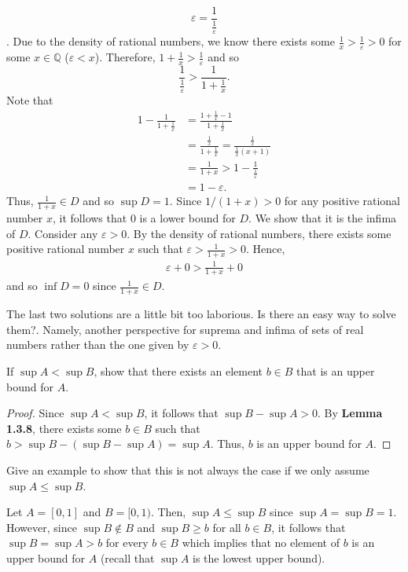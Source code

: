 \documentclass[12pt]{article}
\newcommand{\Q}{\mathbb{Q}}
\newenvironment{problem}[2][Problem]{\begin{trivlist}
		\item[\hskip \labelsep {\bfseries #1}\hskip \labelsep {\bfseries #2.}]}{\end{trivlist}}
\newenvironment{solution}[2][Solution]{\begin{trivlist}
		\item[\hskip \labelsep {\bfseries #1}\hskip \labelsep {\bfseries #2.}]}{\end{trivlist}}
\begin{document}
\begin{problem}{1.3.8}
\begin{enumerate}[label=(\alph*)]
\begin{solution}{d}
		 \[\varepsilon = \frac{1}{\frac{1}{\varepsilon}}\].
		 Due to the density of rational numbers, we know there exists some $\frac{1}{x} > \frac{1}{\varepsilon}>0$ for some $x\in \Q$ ($\varepsilon < x$). Therefore, $1+\frac{1}{x} > \frac{1}{\varepsilon}$ and so 
		 \begin{equation*}
		 	\frac{1}{\frac{1}{\varepsilon}} > \frac{1}{1+\frac{1}{x}}.
		 \end{equation*}
	 Note that 
	 \begin{align*}
	 	1-\frac{1}{1+\frac{1}{x}} &= \frac{1+\frac{1}{x}-1}{1+\frac{1}{x}}\\
	 	&= \frac{\frac{1}{x}}{1+\frac{1}{x}} = \frac{\frac{1}{x}}{\frac{1}{x}(x+1)}\\
	 	&= \frac{1}{1+x}> 1-\frac{1}{\frac{1}{\varepsilon}}\\
	 	&= 1-\varepsilon.
	 \end{align*}
 	Thus, $\frac{1}{1+x}\in D$ and so $\sup D = 1$. Since $1/(1+x) >0$ for any positive rational number $x$, it follows that $0$ is a lower bound for $D$. We show that it is the infima of $D$. Consider any $\varepsilon>0$. By the density of rational numbers, there exists some positive rational number $x$ such that $\varepsilon > \frac{1}{1+x} > 0$. Hence, 
 	\begin{align*}
 		\varepsilon + 0>\frac{1}{1+x}+0
 	\end{align*}
 	and so $\inf D = 0$ since $\frac{1}{1+x}\in D$.
		\end{solution}
			\end{enumerate}
		\end{problem}
	The last two solutions are a little bit too laborious. Is there an easy way to solve them?. Namely, another perspective for suprema and infima of sets of real numbers rather than the one given by $\varepsilon >0$. 
	
		\begin{problem}{1.3.9}
			\begin{enumerate}[label=(\alph*)]
				\item If $\sup A < \sup B$, show that there exists an element $b\in B$ that is an upper bound for $A$.
				\begin{proof}
				 Since $\sup A < \sup B$, it follows that $\sup B-\sup A > 0$. By \textbf{Lemma 1.3.8}, there exists some $b\in B$ such that $b>\sup B - (\sup B- \sup A) = \sup A$. Thus, $b$ is an upper bound for $A$.
				\end{proof}
				\item Give an example to show that this is not always the case if we only assume $\sup A \leq \sup B$.
				\begin{solution}{b}
					Let $A=[0,1]$ and $B=[0,1)$. Then, $\sup A \leq \sup B$ since $\sup A = \sup B = 1$.  However, since $\sup B\not\in B$ and $\sup B \geq b$ for all $b\in B$, it follows that $\sup B = \sup A > b$ for every $b\in B$ which implies that no element of $b$ is an upper bound for $A$ (recall that $\sup A$ is the lowest upper bound). 
				\end{solution}
			\end{enumerate}
		\end{problem}
	
\end{document}
